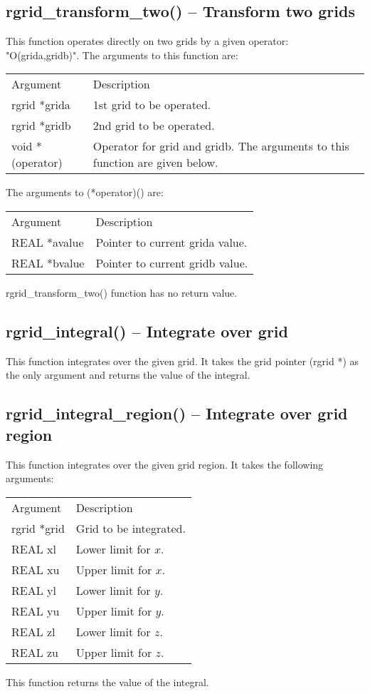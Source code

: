 \documentclass[12pt,letterpaper]{report}
\begin{document}
\subsection{rgrid\_transform\_two() -- Transform two grids}

This function operates directly on two grids by a given operator: "O(grida,gridb)". The arguments to this function are:
\begin{longtable}{p{} p{}}
Argument & Description\\
\cline{1-2}
rgrid *grida & 1st grid to be operated.\\
rgrid *gridb & 2nd grid to be operated.\\
void *(operator) & Operator for grid and gridb. The arguments to this function are given below.\\
\end{longtable}
\noindent
The arguments to (*operator)() are:
\begin{longtable}{p{} p{}}
Argument & Description\\
\cline{1-2}
REAL *avalue & Pointer to current grida value.\\
REAL *bvalue & Pointer to current gridb value.\\
\end{longtable}
\noindent
rgrid\_transform\_two() function has no return value.

\subsection{rgrid\_integral() -- Integrate over grid}

This function integrates over the given grid. It takes the grid pointer (rgrid *) as the only argument and returns the value of the integral. 

\subsection{rgrid\_integral\_region() -- Integrate over grid region}

This function integrates over the given grid region. It takes the following arguments:
\begin{longtable}{p{} p{}}
Argument & Description\\
\cline{1-2}
rgrid *grid & Grid to be integrated.\\
REAL xl & Lower limit for $x$.\\
REAL xu & Upper limit for $x$.\\
REAL yl & Lower limit for $y$.\\
REAL yu & Upper limit for $y$.\\
REAL zl & Lower limit for $z$.\\
REAL zu & Upper limit for $z$.\\
\end{longtable}
\noindent
This function returns the value of the integral. 
\end{document}
